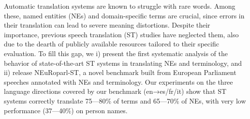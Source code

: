 Automatic translation systems are known to struggle with rare words. Among these, named entities (NEs) and domain-specific terms are crucial, since errors in their translation can lead to severe meaning distortions. Despite their importance, previous speech translation (ST) studies have neglected them, also due to the dearth of publicly available resources tailored to their specific evaluation. To fill this gap, we i) present the first systematic analysis of the behavior of state-of-the-art ST systems in translating NEs and terminology, and ii) release NEuRoparl-ST, a novel benchmark built from European Parliament speeches annotated with NEs and terminology. Our experiments on the three language directions covered by our benchmark (en→es/fr/it) show that ST systems correctly translate 75---80\% of terms and 65---70\% of NEs, with very low performance (37---40\%) on person names.
